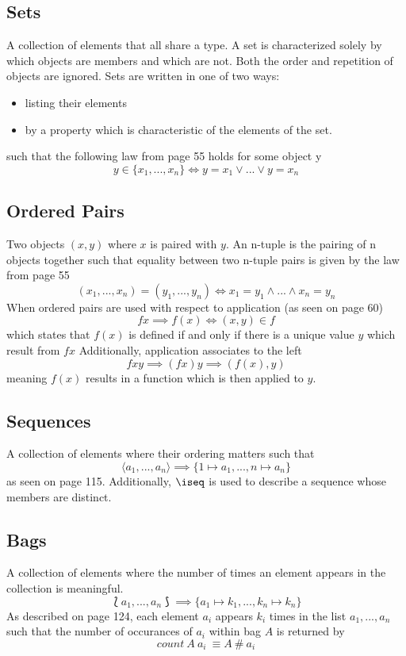 \documentclass[../main.tex]{subfiles}
\begin{document}
\subsection{Sets}
A collection of elements that all share a type. A set is characterized solely by which objects are members and which are not.
Both the order and repetition of objects are ignored. Sets are written in one of two ways:
\begin{itemize}
\item listing their elements
\item by a property which is characteristic of the elements of the set.
\end{itemize}
such that the following law from page 55 holds for some object y
$$y \in \{x_{1},...,x_{n}\} \iff y = x_{1} \lor ... \lor y = x_{n}$$

\subsection{Ordered Pairs}
Two objects $(x, y)$ where $x$ is paired with $y$. An n-tuple is
the pairing of n objects together such that equality between two n-tuple pairs
is given by the law from page 55
$$(x_{1},...,x_{n}) = (y_{1},...,y_{n}) \iff x_{1} = y_{1} \land ... \land x_{n} = y_{n}$$
When ordered pairs are used with respect to application (as seen on page 60)
$$f x \implies f(x) \iff (x,y) \in f$$
which states that $f(x)$ is defined if and only if there is a unique value $y$ which result from $f x$
Additionally, application associates to the left
$$f x y \implies (f x) y \implies (f(x), y)$$
meaning $f(x)$ results in a function which is then applied to $y$.

\subsection{Sequences}
A collection of elements where their ordering matters such that
$$\langle a_{1},...,a_{n} \rangle \implies \{1 \mapsto a_{1}, ..., n \mapsto a_{n}\}$$
as seen on page 115. Additionally, $\iseq$ is used to describe a sequence whose members are distinct.

\subsection{Bags}
A collection of elements where the number of times an element appears in the collection is meaningful.
$$\lbag a_{1},...,a_{n} \rbag \implies \{a_{1} \mapsto k_{1},...,k_{n} \mapsto k_{n}\}$$
As described on page 124, each element $a_{i}$ appears $k_{i}$ times in the list $a_{1},...,a_{n}$
such that the number of occurances of $a_{i}$ within bag $A$ is returned by
$$count ~A ~a_{i} \ \equiv A ~\# ~a_{i}$$
\end{document}
